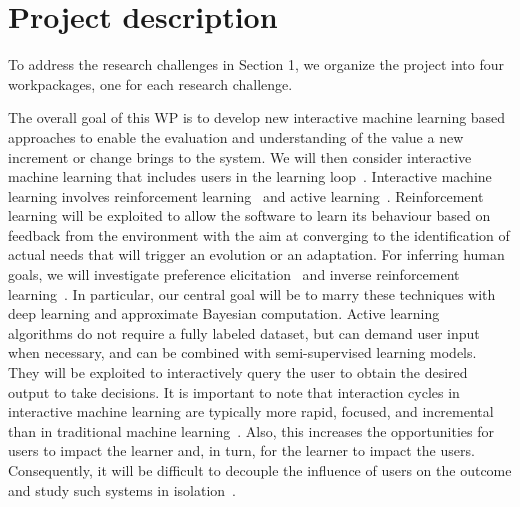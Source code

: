 \documentclass[12pt]{article}
\begin{document}
\vspace{-.5cm}


\section{Project description}
\vspace{-.4cm}



To address the research challenges in Section 1, we organize the project into four workpackages, one for each research challenge.

\vspace{.2cm}
 
\noindent The overall goal of this WP is to develop new 
interactive machine learning based approaches to enable the evaluation and understanding of the value a new increment or change brings to the system.
We will then consider interactive machine learning that includes users in the learning loop~\cite{interactiveMachineLearning}.
Interactive machine learning involves reinforcement learning~\cite{suba,BertsekasTsitsiklis:NDP} and active learning~\cite{ActiveLearning}.
Reinforcement learning will be exploited to allow the software to learn its behaviour based on feedback from the environment 
with the aim at converging to the identification of actual needs that will trigger an evolution or an adaptation. 
For inferring human goals, we will investigate
preference elicitation~\cite{rothkopf:peirl:ecml:2011} and inverse
reinforcement learning~\cite{uai:irl,Choi:NPBIRL:nips2012}. In
particular, our central goal will be to marry these techniques with deep learning
and approximate Bayesian computation. 
Active learning~\cite{ActiveLearning} algorithms do not require a fully labeled dataset,
but can demand user input when necessary, and can be combined with
semi-supervised learning models. They will be exploited to interactively
query the user to obtain the desired output to take decisions. 
It is important to note that interaction cycles in interactive machine
learning are typically more rapid, focused, and incremental than in traditional machine learning~\cite{interactiveMachineLearningExperience}.
Also, this increases the opportunities for users to impact the learner and, in turn, for the learner to
impact the users. Consequently, it will be difficult to
decouple the influence of users on the outcome and study such systems in isolation~\cite{interactiveMachineLearningExperience}. 
\end{document}
